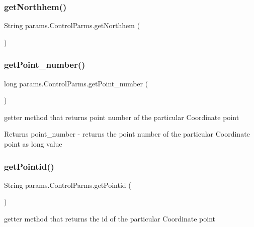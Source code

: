 \subsubsection{\texorpdfstring{get\+Northhem()}{getNorthhem()}}
{\footnotesize\ttfamily String params.\+Control\+Parms.\+get\+Northhem (\begin{DoxyParamCaption}{ }\end{DoxyParamCaption})}

\mbox{\label{classparams_1_1_control_parms_a4849978cd3cad0b731e744d16ff90c97}} 
\subsubsection{\texorpdfstring{get\+Point\+\_\+number()}{getPoint\_number()}}
{\footnotesize\ttfamily long params.\+Control\+Parms.\+get\+Point\+\_\+number (\begin{DoxyParamCaption}{ }\end{DoxyParamCaption})}



getter method that returns point number of the particular Coordinate point 

\begin{DoxyReturn}{Returns}
point\+\_\+number -\/ returns the point number of the particular Coordinate point as long value 
\end{DoxyReturn}
\mbox{\label{classparams_1_1_control_parms_a0a9e4c1b1507109c2af9362c76f152b5}} 
\subsubsection{\texorpdfstring{get\+Pointid()}{getPointid()}}
{\footnotesize\ttfamily String params.\+Control\+Parms.\+get\+Pointid (\begin{DoxyParamCaption}{ }\end{DoxyParamCaption})}



getter method that returns the id of the particular Coordinate point 

